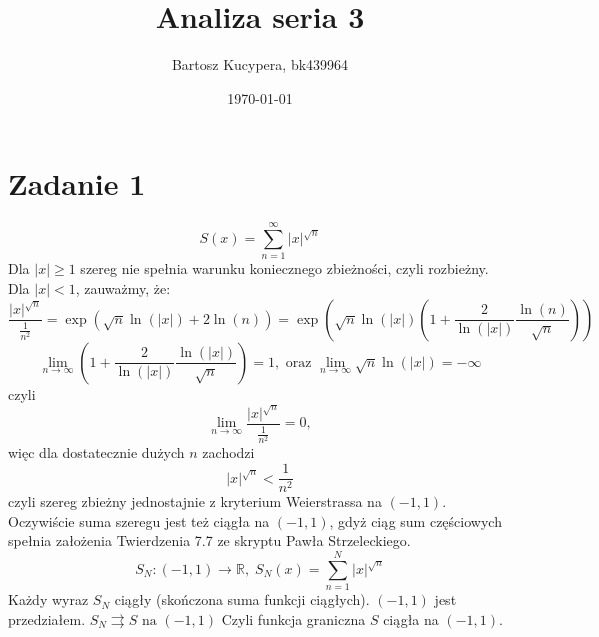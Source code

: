 \documentclass{article}
\title{Analiza seria 3}
\author{Bartosz Kucypera, bk439964}
\date{\today}
\begin{document}
\maketitle

\section*{Zadanie 1}
$$ \displaystyle S(x) =\sum_{n=1}^{\infty} |x|^{\sqrt{n}} $$
Dla $|x| \ge 1$ szereg nie spełnia warunku koniecznego zbieżności, czyli rozbieżny. \newline \newline
Dla $|x| < 1$, zauważmy, że:
$$\displaystyle \frac{|x|^{\sqrt{n}}}{\frac{1}{n^2}} = \exp(\sqrt{n}\ln(|x|) +2\ln(n)) = 
\exp\left(\sqrt{n}\ln(|x|) \left( 1 + \frac{2}{\ln(|x|)}\frac{\ln(n)}{\sqrt{n}} \right) \right) $$
$$ \displaystyle \lim_{n \to \infty} \left(1 + \frac{2}{\ln(|x|)} \frac{\ln(|x|)}{\sqrt{n}} \right) = 1, \mbox{ oraz } \lim_{n \to \infty} \sqrt{n}\ln(|x|) = -\infty $$
czyli 
$$ \lim_{n \to \infty} \frac{|x|^{\sqrt{n}}}{\frac{1}{n^2}} = 0, $$
więc dla dostatecznie dużych $n$ zachodzi $$|x|^{\sqrt{n}} < \frac{1}{n^2}$$
czyli szereg zbieżny jednostajnie z kryterium Weierstrassa na $(-1, 1)$. \newline
Oczywiście suma szeregu jest też ciągła na $(-1, 1)$, gdyż ciąg sum częściowych spełnia założenia Twierdzenia 7.7 ze skryptu Pawła Strzeleckiego. 
$$ S_N : (-1, 1) \to \mathbb{R}, \; S_N(x) = \sum_{n=1}^{N} |x|^{\sqrt{n}} $$
Każdy wyraz $S_N$ ciągły (skończona suma funkcji ciągłych). \newline
$(-1, 1)$ jest przedziałem. \newline
$S_N \rightrightarrows S \mbox{ na } (-1, 1)$ \newline
Czyli funkcja graniczna $S$ ciągła na $(-1, 1)$.
\end{document}
